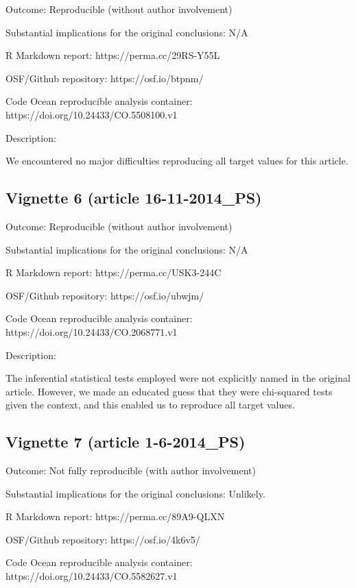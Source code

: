 \documentclass[english,,man,floatsintext]{apa6}
\begin{document}
\begin{appendix}
Outcome: Reproducible (without author involvement)

Substantial implications for the original conclusions: N/A

R Markdown report: https://perma.cc/29RS-Y55L

OSF/Github repository: https://osf.io/btpnm/

Code Ocean reproducible analysis container:
https://doi.org/10.24433/CO.5508100.v1

Description:

We encountered no major difficulties reproducing all target values for
this article.

\hypertarget{vignette-6-article-16-11-2014_ps}{%
\subsection{Vignette 6 (article
16-11-2014\_PS)}\label{vignette-6-article-16-11-2014_ps}}

Outcome: Reproducible (without author involvement)

Substantial implications for the original conclusions: N/A

R Markdown report: https://perma.cc/USK3-244C

OSF/Github repository: https://osf.io/ubwjm/

Code Ocean reproducible analysis container:
https://doi.org/10.24433/CO.2068771.v1

Description:

The inferential statistical tests employed were not explicitly named in
the original article. However, we made an educated guess that they were
chi-squared tests given the context, and this enabled us to reproduce
all target values.

\hypertarget{vignette-7-article-1-6-2014_ps}{%
\subsection{Vignette 7 (article
1-6-2014\_PS)}\label{vignette-7-article-1-6-2014_ps}}

Outcome: Not fully reproducible (with author involvement)

Substantial implications for the original conclusions: Unlikely.

R Markdown report: https://perma.cc/89A9-QLXN

OSF/Github repository: https://osf.io/4k6v5/

Code Ocean reproducible analysis container:
https://doi.org/10.24433/CO.5582627.v1


\end{appendix}
\end{document}
